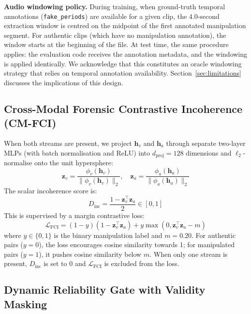 \documentclass[conference]{IEEEtran}
\begin{document}
\textbf{Audio windowing policy.} During training, when ground-truth temporal annotations (\texttt{fake\_periods}) are available for a given clip, the 4.0-second extraction window is centred on the midpoint of the first annotated manipulation segment. For authentic clips (which have no manipulation annotation), the window starts at the beginning of the file. At test time, the same procedure applies: the evaluation code receives the annotation metadata, and the windowing is applied identically. We acknowledge that this constitutes an oracle windowing strategy that relies on temporal annotation availability. Section~\ref{sec:limitations} discusses the implications of this design.

\subsection{Cross-Modal Forensic Contrastive Incoherence (CM-FCI)}

When both streams are present, we project $\mathbf{h}_v$ and $\mathbf{h}_a$ through separate two-layer MLPs (with batch normalisation and ReLU) into $d_{\mathrm{proj}} = 128$ dimensions and $\ell_2$-normalise onto the unit hypersphere:
\begin{equation}
\mathbf{z}_v = \frac{\phi_v(\mathbf{h}_v)}{\|\phi_v(\mathbf{h}_v)\|_2}, \quad \mathbf{z}_a = \frac{\phi_a(\mathbf{h}_a)}{\|\phi_a(\mathbf{h}_a)\|_2}
\end{equation}
The scalar incoherence score is:
\begin{equation}
D_{\mathrm{inc}} = \frac{1 - \mathbf{z}_v^\top \mathbf{z}_a}{2} \in [0, 1]
\end{equation}
This is supervised by a margin contrastive loss:
\begin{equation}
\mathcal{L}_{\mathrm{FCI}} = (1 - y)(1 - \mathbf{z}_v^\top \mathbf{z}_a) + y \max(0, \mathbf{z}_v^\top \mathbf{z}_a - m)
\end{equation}
where $y \in \{0, 1\}$ is the binary manipulation label and $m = 0.20$. For authentic pairs ($y = 0$), the loss encourages cosine similarity towards 1; for manipulated pairs ($y = 1$), it pushes cosine similarity below $m$. When only one stream is present, $D_{\mathrm{inc}}$ is set to 0 and $\mathcal{L}_{\mathrm{FCI}}$ is excluded from the loss.

\subsection{Dynamic Reliability Gate with Validity Masking}
\end{document}
